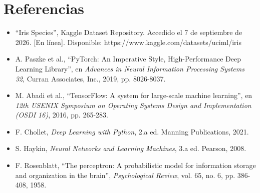 \documentclass[12pt]{article}
\begin{document}
	\newpage
	\section{Referencias}
	
	\begin{itemize}
		\item ``Iris Species'', Kaggle Dataset Repository. Accedido el 7 de septiembre de 2026. [En línea]. Disponible: https://www.kaggle.com/datasets/uciml/iris
		\item A. Paszke et al., ``PyTorch: An Imperative Style, High-Performance Deep Learning Library'', en \textit{Advances in Neural Information Processing Systems 32}, Curran Associates, Inc., 2019, pp. 8026-8037.
		\item M. Abadi et al., ``TensorFlow: A system for large-scale machine learning'', en \textit{12th USENIX Symposium on Operating Systems Design and Implementation (OSDI 16)}, 2016, pp. 265-283.
		\item F. Chollet, \textit{Deep Learning with Python}, 2.a ed. Manning Publications, 2021.
		\item S. Haykin, \textit{Neural Networks and Learning Machines}, 3.a ed. Pearson, 2008.
		\item F. Rosenblatt, ``The perceptron: A probabilistic model for information storage and organization in the brain'', \textit{Psychological Review}, vol. 65, no. 6, pp. 386-408, 1958.
	\end{itemize}
	
\end{document}
